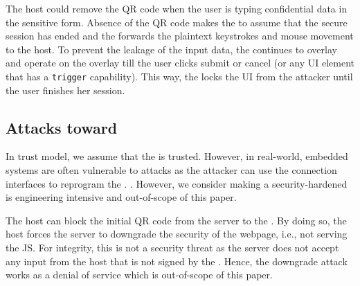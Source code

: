 \parasave
{} The host could remove the QR code when the user is typing confidential data in the sensitive form. Absence of the QR code makes the \device to assume that the secure session has ended and the \device forwards the plaintext keystrokes and mouse movement to the host. To prevent the leakage of the input data, the \device continues to overlay and operate on the overlay till the user clicks submit or cancel (or any UI element that has a \texttt{trigger}  capability). This way, the \device locks the UI from the attacker until the user finishes her session.

\subsection{Attacks toward \device} 
\label{sec:securityAnalysis:device}

In \name trust model, we assume that the \device is trusted. However, in real-world, embedded systems are often vulnerable to attacks as the attacker can use the connection interfaces to reprogram the \device. . However, we consider making a security-hardened \device is engineering intensive and out-of-scope of this paper. 

\parasave
{} The host can block the initial QR code from the server to the \device. By doing so, the host forces the server to downgrade the security of the webpage, i.e., not serving the \name JS. For integrity, this is not a security threat as the server does not accept any input from the host that is not signed by the \device. Hence, the downgrade attack works as a denial of service which is out-of-scope of this paper.

